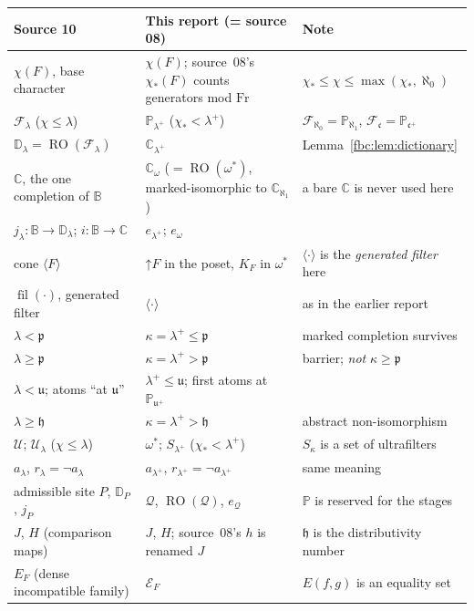 \documentclass[11pt,letterpaper]{article}
\theoremstyle{definition}
\theoremstyle{remark}
\newcommand{\om}{\omega}
\newcommand{\Fr}{\mathrm{Fr}}
\newcommand{\B}{\mathbb B}
\newcommand{\C}{\mathbb C}
\newcommand{\PP}{\mathbb P}
\newcommand{\cp}{\mathfrak p}
\newcommand{\cu}{\mathfrak u}
\newcommand{\cc}{\mathfrak c}
\newcommand{\ch}{\mathfrak h}
\newcommand{\gen}[1]{\langle #1\rangle}
\newcommand{\up}{\mathord{\uparrow}}
\newcommand{\RO}{\operatorname{RO}}
\newcommand{\cE}{\mathcal E}
\newcommand{\cQ}{\mathcal Q}
\newcommand{\eqset}[2]{E(#1,#2)}
\begin{document}
{\small
\begin{longtable}{@{}>{\raggedright\arraybackslash}p{}>{\raggedright\arraybackslash}p{}>{\raggedright\arraybackslash}p{}@{}}
\toprule
Source 10 & This report (= source 08) & Note\\
\midrule
\endhead
$\chi(F)$, base character & $\chi(F)$; source~08's $\chi_*(F)$ counts generators mod $\Fr$ & $\chi_*\leq\chi\leq\max(\chi_*,\aleph_0)$\\
$\mathcal F_\lambda$ ($\chi\leq\lambda$) & $\PP_{\lambda^+}$ ($\chi_*<\lambda^+$) & $\mathcal F_{\aleph_0}=\PP_{\aleph_1}$, $\mathcal F_\cc=\PP_{\cc^+}$\\
$\mathbb D_\lambda=\RO(\mathcal F_\lambda)$ & $\C_{\lambda^+}$ & Lemma~\ref{fbc:lem:dictionary}\\
$\mathbb C$, the one completion of $\B$ & $\C_\om$ ($=\RO(\om^*)$, marked-isomorphic to $\C_{\aleph_1}$) & a bare $\C$ is never used here\\
$j_\lambda:\B\to\mathbb D_\lambda$; $i:\B\to\mathbb C$ & $e_{\lambda^+}$; $e_\om$ & \\
cone $\langle F\rangle$ & $\up F$ in the poset, $K_F$ in $\om^*$ & $\gen{\cdot}$ is the \emph{generated filter} here\\
$\operatorname{fil}(\cdot)$, generated filter & $\gen{\cdot}$ & as in the earlier report\\
$\lambda<\cp$ & $\kappa=\lambda^+\leq\cp$ & marked completion survives\\
$\lambda\geq\cp$ & $\kappa=\lambda^+>\cp$ & barrier; \emph{not} $\kappa\geq\cp$\\
$\lambda<\cu$; atoms ``at $\cu$'' & $\lambda^+\leq\cu$; first atoms at $\PP_{\cu^+}$ & \\
$\lambda\geq\ch$ & $\kappa=\lambda^+>\ch$ & abstract non-isomorphism\\
$\mathcal U$; $\mathcal U_\lambda$ ($\chi\leq\lambda$) & $\om^*$; $S_{\lambda^+}$ ($\chi_*<\lambda^+$) & $S_\kappa$ is a set of ultrafilters\\
$a_\lambda$, $r_\lambda=\neg a_\lambda$ & $a_{\lambda^+}$, $r_{\lambda^+}=\neg a_{\lambda^+}$ & same meaning\\
admissible site $P$, $\mathbb D_P$, $j_P$ & $\cQ$, $\RO(\cQ)$, $e_\cQ$ & $\PP$ is reserved for the stages\\
$J$, $H$ (comparison maps) & $J$, $H$; source~08's $h$ is renamed $J$ & $\ch$ is the distributivity number\\
$E_F$ (dense incompatible family) & $\cE_F$ & $\eqset fg$ is an equality set\\

\end{longtable}}
\end{document}
